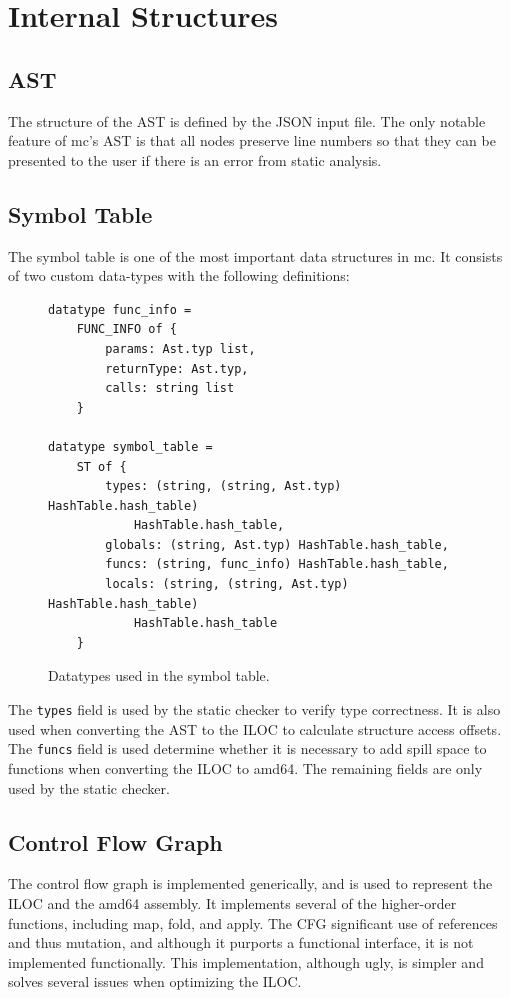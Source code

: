 \documentclass[12pt]{article}
\begin{document}
\section*{Internal Structures}
\subsection*{AST}
The structure of the AST is defined by the JSON input file. The only notable feature of mc's AST is that all nodes preserve line numbers so that they can be presented to the user if there is an error from static analysis.

\subsection*{Symbol Table}
The symbol table is one of the most important data structures in mc. It consists of two custom data-types with the following definitions:

\begin{figure}
\centering
\begin{BVerbatim}[fontsize=\scriptsize]
datatype func_info =
    FUNC_INFO of {
        params: Ast.typ list,
        returnType: Ast.typ,
        calls: string list
    }

datatype symbol_table =
    ST of {
        types: (string, (string, Ast.typ) HashTable.hash_table)
            HashTable.hash_table,
        globals: (string, Ast.typ) HashTable.hash_table,
        funcs: (string, func_info) HashTable.hash_table,
        locals: (string, (string, Ast.typ) HashTable.hash_table)
            HashTable.hash_table
    }
\end{BVerbatim}
\caption{Datatypes used in the symbol table.}
\end{figure}

The \texttt{types} field is used by the static checker to verify type correctness. It is also used when converting the AST to the ILOC to calculate structure access offsets. The \texttt{funcs} field is used determine whether it is necessary to add spill space to functions when converting the ILOC to amd64. The remaining fields are only used by the static checker.

\subsection*{Control Flow Graph}
The control flow graph is implemented generically, and is used to represent the ILOC and the amd64 assembly. It implements several of the higher-order functions, including map, fold, and apply. The CFG significant use of references and thus mutation, and although it purports a functional interface, it is not implemented functionally. This implementation, although ugly, is simpler and solves several issues when optimizing the ILOC.
\end{document}
